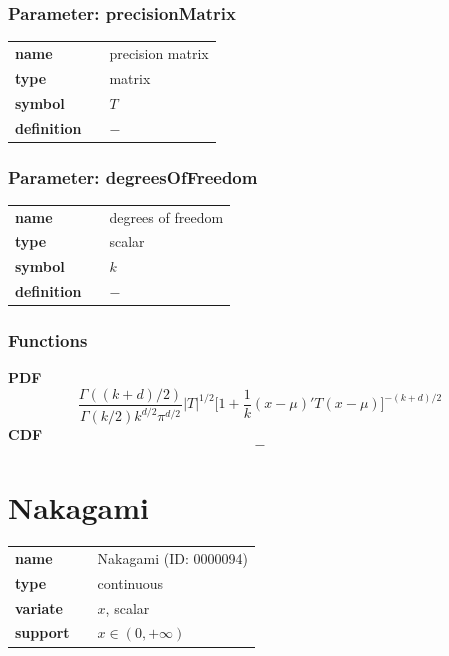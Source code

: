 \documentclass{article}
\begin{document}
\subsubsection*{Parameter: precisionMatrix}

\noindent\begin{tabular}{p{2cm}cl}
\textbf{name} & & precision matrix \\
\textbf{type} & & matrix \\
\textbf{symbol} & & $T$  \\
\textbf{definition} & & $-$
\end{tabular}
\subsubsection*{Parameter: degreesOfFreedom}

\noindent\begin{tabular}{p{2cm}cl}
\textbf{name} & & degrees of freedom \\
\textbf{type} & & scalar \\
\textbf{symbol} & & $k$  \\
\textbf{definition} & & $-$
\end{tabular}
\subsubsection*{Functions}

\smallskip \noindent \hspace{.2cm} \textbf{PDF} 
\begin{equation*}\frac{\Gamma((k+d)/2)}{\Gamma(k/2) k^{d/2} \pi^{d/2}}|T|^{1/2} \Big[ 1 + \frac{1}{k}(x-\mu)' T (x-\mu) \Big]^{-(k+d)/2}\end{equation*}
\smallskip \noindent \hspace{.2cm} \textbf{CDF} 
\begin{equation*}-\end{equation*}
\smallskip\section*{Nakagami} 

  \bigskip 

\begin{tabular}{p{2cm}cl}
\textbf{name} & & Nakagami (ID: 0000094)\\ 
 
\textbf{type} & & continuous \\ 

\textbf{variate} & & $x$, scalar \\ 

\textbf{support} & & $x \in (0,+\infty)$
\end{tabular}
\end{document}
